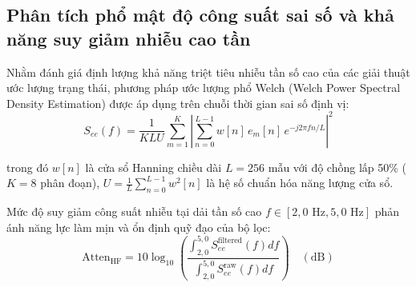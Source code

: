 \begin{table}[H]
\centering
\caption{Đo đạc mức độ chiếm dụng RAM và ổn định tài nguyên trong phiên thử nghiệm liên tục 1 giờ}
\label{tab:long-term-memory-stability}
\end{table}

\subsection{Phân tích phổ mật độ công suất sai số và khả năng suy giảm nhiễu cao tần}

\hspace{0.5cm} Nhằm đánh giá định lượng khả năng triệt tiêu nhiễu tần số cao của các giải thuật ước lượng trạng thái, phương pháp ước lượng phổ Welch (Welch Power Spectral Density Estimation) được áp dụng trên chuỗi thời gian sai số định vị:
\begin{equation}
S_{ee}(f) = \frac{1}{K L U} \sum_{m=1}^{K} \left| \sum_{n=0}^{L-1} w[n] \, e_m[n] \, e^{-j 2\pi f n / L} \right|^2
\label{eq:welch-psd-error-w11}
\end{equation}

trong đó $w[n]$ là cửa sổ Hanning chiều dài $L = 256$ mẫu với độ chồng lấp 50\% ($K = 8$ phân đoạn), $U = \frac{1}{L} \sum_{n=0}^{L-1} w^2[n]$ là hệ số chuẩn hóa năng lượng cửa sổ.

Mức độ suy giảm công suất nhiễu tại dải tần số cao $f \in [2{,}0\text{ Hz}, 5{,}0\text{ Hz}]$ phản ánh năng lực làm mịn và ổn định quỹ đạo của bộ lọc:
\begin{equation}
\text{Atten}_{\text{HF}} = 10 \log_{10} \left( \frac{\int_{2{,}0}^{5{,}0} S_{ee}^{\text{filtered}}(f) df}{\int_{2{,}0}^{5{,}0} S_{ee}^{\text{raw}}(f) df} \right) \quad (\text{dB})
\label{eq:high-freq-attenuation-w11}
\end{equation}

